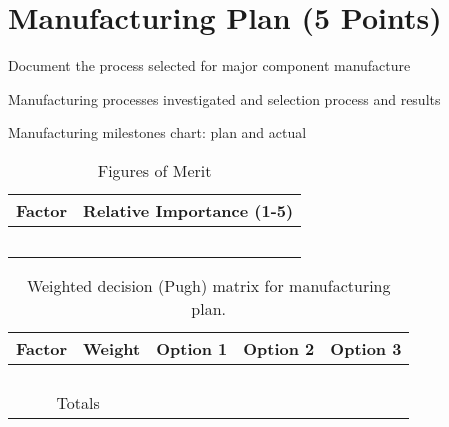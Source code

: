 \documentclass[report]{byu-aero}
\begin{document}





\section{Manufacturing Plan (5 Points)}
\label{sec:ManufacturingPlan}

Document the process selected for major component manufacture

Manufacturing processes investigated and selection process and results

Manufacturing milestones chart: plan and actual

\begin{table}[h!]
	\centering
	\caption{Figures of Merit}
	\label{tab:fomman}
	\begin{tabular}{ |c|c| } 
		\hline
		\rowcolor{BYUbluemid}
    	Factor & Relative Importance (1-5) \\ 
		\hline
	     &  \\ 
		\hline
		 &  \\ 
		\hline
		 &  \\ 
		\hline
		 &  \\ 
		\hline
		 &  \\ 
		\hline
	\end{tabular}
\end{table}

\begin{table}[h!]
	\centering
	\caption{Weighted decision (Pugh) matrix for manufacturing plan.}
	\label{tab:decisionmatrixmanufacturing}
	\begin{tabular}{ |c|c|c|c|c| } 
		\hline
		\rowcolor{BYUbluemid}
    	Factor & Weight & Option 1 & Option 2 & Option 3 \\ 
		\hline
	     &  &  &  &  \\ 
		\hline
		 &  &  &  &  \\ 
		\hline
		 &  &  &  &  \\ 
		\hline
		 &  &  &  &  \\ 
		\hline
		\multicolumn{2}{|c|}{Totals} &  &  &  \\ %
		\hline
	\end{tabular}
\end{table}
\end{document}

